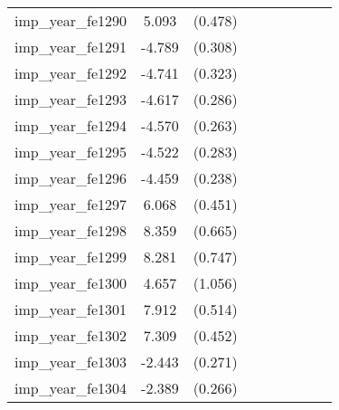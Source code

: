 {\begin{tabular}{l*{4}{cc}}
imp\_year\_fe1290&    5.093\sym{***}&  (0.478)&                  &         &                  &         &                  &         \\
imp\_year\_fe1291&   -4.789\sym{***}&  (0.308)&                  &         &                  &         &                  &         \\
imp\_year\_fe1292&   -4.741\sym{***}&  (0.323)&                  &         &                  &         &                  &         \\
imp\_year\_fe1293&   -4.617\sym{***}&  (0.286)&                  &         &                  &         &                  &         \\
imp\_year\_fe1294&   -4.570\sym{***}&  (0.263)&                  &         &                  &         &                  &         \\
imp\_year\_fe1295&   -4.522\sym{***}&  (0.283)&                  &         &                  &         &                  &         \\
imp\_year\_fe1296&   -4.459\sym{***}&  (0.238)&                  &         &                  &         &                  &         \\
imp\_year\_fe1297&    6.068\sym{***}&  (0.451)&                  &         &                  &         &                  &         \\
imp\_year\_fe1298&    8.359\sym{***}&  (0.665)&                  &         &                  &         &                  &         \\
imp\_year\_fe1299&    8.281\sym{***}&  (0.747)&                  &         &                  &         &                  &         \\
imp\_year\_fe1300&    4.657\sym{***}&  (1.056)&                  &         &                  &         &                  &         \\
imp\_year\_fe1301&    7.912\sym{***}&  (0.514)&                  &         &                  &         &                  &         \\
imp\_year\_fe1302&    7.309\sym{***}&  (0.452)&                  &         &                  &         &                  &         \\
imp\_year\_fe1303&   -2.443\sym{***}&  (0.271)&                  &         &                  &         &                  &         \\
imp\_year\_fe1304&   -2.389\sym{***}&  (0.266)&                  &         &                  &         &                  &         \\

\end{tabular}}

